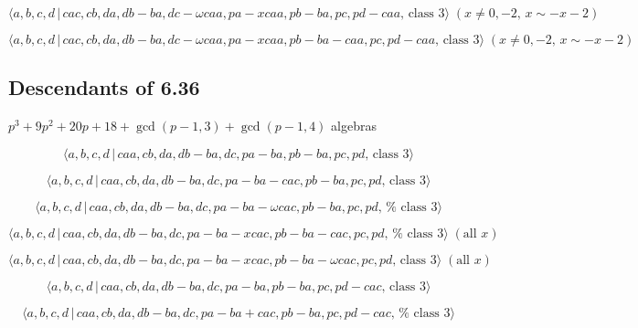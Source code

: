 \documentclass[10pt]{article}
\begin{document}
\begin{equation}
\langle a,b,c,d\,|\,cac,cb,da,db-ba,dc-\omega caa,pa-xcaa,pb-ba,pc,pd-caa,\,%
\text{class }3\rangle \;(x\neq 0,-2,\,x\sim -x-2)  \tag{7.4217}
\end{equation}

\begin{equation}
\langle a,b,c,d\,|\,cac,cb,da,db-ba,dc-\omega
caa,pa-xcaa,pb-ba-caa,pc,pd-caa,\,\text{class }3\rangle \;(x\neq
0,-2,\,x\sim -x-2)  \tag{7.4218}
\end{equation}

\subsection{Descendants of 6.36}

$p^{3}+9p^{2}+20p+18+\gcd (p-1,3)+\gcd (p-1,4)$ algebras

\begin{equation}
\langle a,b,c,d\,|\,caa,cb,da,db-ba,dc,pa-ba,pb-ba,pc,pd,\,\text{class }%
3\rangle  \tag{7.4219}
\end{equation}

\begin{equation}
\langle a,b,c,d\,|\,caa,cb,da,db-ba,dc,pa-ba-cac,pb-ba,pc,pd,\,\text{class }%
3\rangle  \tag{7.4220}
\end{equation}

\begin{equation}
\langle a,b,c,d\,|\,caa,cb,da,db-ba,dc,pa-ba-\omega cac,pb-ba,pc,pd,\,\text{%
class }3\rangle  \tag{7.4221}
\end{equation}

\begin{equation}
\langle a,b,c,d\,|\,caa,cb,da,db-ba,dc,pa-ba-xcac,pb-ba-cac,pc,pd,\,\text{%
class }3\rangle \;(\text{all }x)  \tag{7.4222}
\end{equation}

\begin{equation}
\langle a,b,c,d\,|\,caa,cb,da,db-ba,dc,pa-ba-xcac,pb-ba-\omega cac,pc,pd,\,%
\text{class }3\rangle \;(\text{all }x)  \tag{7.4223}
\end{equation}

\begin{equation}
\langle a,b,c,d\,|\,caa,cb,da,db-ba,dc,pa-ba,pb-ba,pc,pd-cac,\,\text{class }%
3\rangle  \tag{7.4224}
\end{equation}

\begin{equation}
\langle a,b,c,d\,|\,caa,cb,da,db-ba,dc,pa-ba+cac,pb-ba,pc,pd-cac,\,\text{%
class }3\rangle  \tag{7.4225}
\end{equation}
\end{document}
